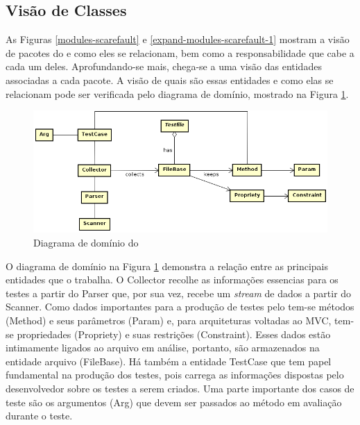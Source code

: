 \subsection{Visão de Classes}
As Figuras \ref{modules-scarefault} e \ref{expand-modules-scarefault-1} mostram
a visão de pacotes do \scarefault e como eles se relacionam, bem como a
responsabilidade que cabe a cada um deles. Aprofundando-se mais, chega-se a uma
visão das entidades associadas a cada pacote. A visão de quais são essas
entidades e como elas se relacionam pode ser verificada pelo diagrama de 
domínio, mostrado na Figura \ref{domain-diagram}.
\begin{figure}[h]
  \centering
    \includegraphics[width=\textwidth]{figuras/domain-diagram.png}
    \caption{Diagrama de domínio do \scarefault}
    \label{domain-diagram}
\end{figure}
\FloatBarrier

O diagrama de domínio na Figura \ref{domain-diagram} demonstra a relação
entre as principais entidades que o \framework trabalha. O \textsf{Collector}
recolhe as  informações essencias para os testes a partir do
\textsf{Parser} que, por sua vez, recebe um \textit{stream} de dados a partir
do \textsf{Scanner}. Como dados importantes para a produção de testes pelo
\scarefault tem-se métodos (\textsf{Method}) e seus parâmetros (\textsf{Param})
e, para arquiteturas voltadas ao MVC, tem-se propriedades (\textsf{Propriety})
e suas restrições (\textsf{Constraint}). Esses dados estão intimamente ligados
ao arquivo em análise, portanto, são armazenados na entidade arquivo (\textsf{FileBase}).
Há também a entidade \textsf{TestCase} que tem papel fundamental na produção
dos testes, pois carrega as informações dispostas pelo desenvolvedor sobre os
testes a serem criados. Uma parte importante dos casos de teste são os
argumentos (\textsf{Arg}) que devem ser passados ao método em avaliação durante o
teste.

